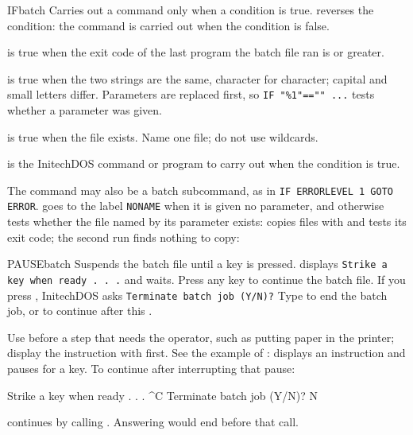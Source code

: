 \begin{DosEntry}{IF}{}{batch}
\Purpose Carries out a command only when a condition is true.
\Format {}
\Remarks
{} reverses the condition: the command is carried out when the
condition is false.

 is true when the exit code of the last program
the batch file ran is  or greater.

 is true when the two strings are the same,
character for character; capital and small letters differ.  Parameters are
replaced first, so \texttt{IF "\%1"=="" ...} tests whether a parameter was
given.

 is true when the file exists.  Name one file; do not
use wildcards.

 is the InitechDOS command or program to carry out when the
condition is true.

The command may also be a batch subcommand, as in
\texttt{IF ERRORLEVEL 1 GOTO ERROR}.
\Example
{} goes to the label \texttt{NONAME} when it is given no
parameter, and otherwise tests whether the file named by its parameter
exists:
 copies files with  and tests its exit code; the
second run finds nothing to copy:
\end{DosEntry}

\begin{DosEntry}{PAUSE}{}{batch}
\Purpose Suspends the batch file until a key is pressed.
\Format {}
\Remarks
{} displays \texttt{Strike a key when ready . . .} and waits.
Press any key to continue the batch file.  If you press ,
InitechDOS asks \texttt{Terminate batch job (Y/N)?}  Type  to end
the batch job, or  to continue after this .

Use  before a step that needs the operator, such as putting
paper in the printer; display the instruction with  first.
\Example
See the example of :  displays an instruction
and pauses for a key.  To continue after interrupting that pause:
\begin{TypeIn}
Strike a key when ready . . .
^C
Terminate batch job (Y/N)? N
\end{TypeIn}
 continues by calling .  Answering
 would end  before that call.
\end{DosEntry}

